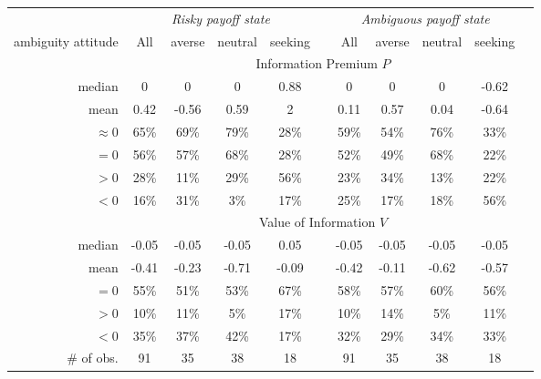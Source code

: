 \begin{tabular}{ r c c c c c c c c c c }
\toprule 
& \multicolumn{4}{c}{\it Risky payoff state} & & \multicolumn{4}{c}{\it Ambiguous payoff state}\\
\cmidrule[\mrw](lr){2-5} \cmidrule[\mrw](lr){7-10}
ambiguity attitude & \multicolumn{1}{c}{All} & \multicolumn{1}{c}{averse} & \multicolumn{1}{c}{neutral} & \multicolumn{1}{c}{seeking} & & \multicolumn{1}{c}{All} & \multicolumn{1}{c}{averse} & \multicolumn{1}{c}{neutral} & \multicolumn{1}{c}{seeking}\\
\midrule[\mrw] 
& \multicolumn{9}{c}{Information Premium $P$}\\ 
\midrule[\mrw] 
median & 0 & 0 & 0 & 0.88 &  & 0 & 0 & 0 & -0.62 \\
mean & 0.42 & -0.56 & 0.59 & 2 &  & 0.11 & 0.57 & 0.04 & -0.64 \\
$\approx 0$ & 65\% & 69\% & 79\% & 28\% &  & 59\% & 54\% & 76\% & 33\% \\
$=0$ & 56\% & 57\% & 68\% & 28\% &  & 52\% & 49\% & 68\% & 22\% \\
$>0$ & 28\% & 11\% & 29\% & 56\% &  & 23\% & 34\% & 13\% & 22\% \\
$<0$ & 16\% & 31\% & 3\% & 17\% &  & 25\% & 17\% & 18\% & 56\% \\
\midrule[\mrw] 
& \multicolumn{9}{c}{Value of Information $V$}\\ 
\midrule[\mrw] 
median & -0.05 & -0.05 & -0.05 & 0.05 &  & -0.05 & -0.05 & -0.05 & -0.05 \\
mean & -0.41 & -0.23 & -0.71 & -0.09 &  & -0.42 & -0.11 & -0.62 & -0.57 \\
$=0$ & 55\% & 51\% & 53\% & 67\% &  & 58\% & 57\% & 60\% & 56\% \\
$>0$ & 10\% & 11\% & 5\% & 17\% &  & 10\% & 14\% & 5\% & 11\% \\
$<0$ & 35\% & 37\% & 42\% & 17\% &  & 32\% & 29\% & 34\% & 33\% \\
\midrule[\mrw] 
\# of obs. & 91 & 35 & 38 & 18 &  & 91 & 35 & 38 & 18 \\
\bottomrule 
 \end{tabular}